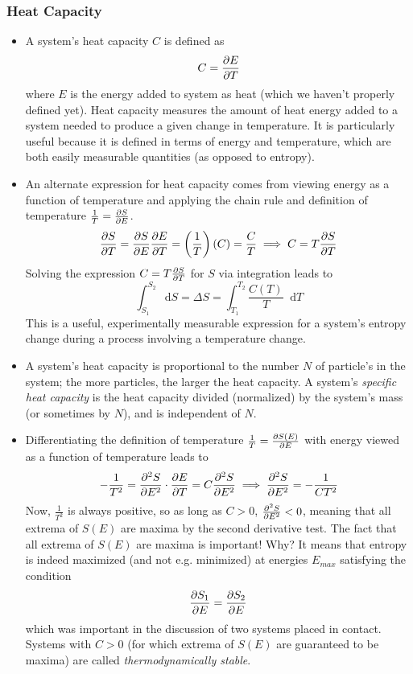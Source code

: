 \documentclass[11pt, a4paper]{article}
\newcommand{\diff}{\mathop{}\!\mathrm{d}} %
\begin{document}
\subsubsection{Heat Capacity}
\begin{itemize}
	\item A system's heat capacity $ C $ is defined as
	\begin{equation*}
		C = \pdv{E}{T}
	\end{equation*}
	where $ E $ is the energy added to system as heat (which we haven't properly defined yet). Heat capacity measures the amount of heat energy added to a system needed to produce a given change in temperature. It is particularly useful because it is defined in terms of energy and temperature, which are both easily measurable quantities (as opposed to entropy).
	
	\item An alternate expression for heat capacity comes from viewing energy as a function of temperature and applying the chain rule and definition of temperature $ \frac{1}{T} = \pdv{S}{E} $.
	\begin{equation*}
		\pdv{S}{T} = \pdv{S}{E} \pdv{E}{T} = \left (\frac{1}{T}\right )(C) = \frac{C}{T} \implies C = T \pdv{S}{T}
	\end{equation*}
	Solving the expression $ C = T \pdv{S}{T} $ for $ S $ via integration leads to
	\begin{equation*}
		\int_{S_{1}}^{S_{2}}\diff S = \Delta S = \int_{T_{1}}^{T_{2}}\frac{C(T)}{T}\diff T
	\end{equation*}
	This is a useful, experimentally measurable expression for a system's entropy change during a process involving a temperature change.
	
	\item A system's heat capacity is proportional to the number $ N $ of particle's in the system; the more particles, the larger the heat capacity. A system's \textit{specific heat capacity} is the heat capacity divided (normalized) by the system's mass (or sometimes by $ N $), and is independent of $ N $. 
	
	\item Differentiating the definition of temperature $ \frac{1}{T} = \pdv{S(E)}{E} $ with energy viewed as a function of temperature leads to 
	\begin{equation*}
		-\frac{1}{T^{2}} = \pdv[2]{S}{E} \cdot \pdv{E}{T} = C \pdv[2]{S}{E}  \implies  \pdv[2]{S}{E}  = -\frac{1}{CT^{2}}
	\end{equation*}
	Now, $ \frac{1}{T^{2}} $ is always positive, so as long as $ C > 0 $, $ \pdv[2]{S}{E} < 0 $, meaning that all extrema of $ S(E) $ are maxima by the second derivative test. The fact that all extrema of $ S(E) $ are maxima is important! Why? It means that entropy is indeed maximized (and not e.g. minimized) at energies $ E_{max} $ satisfying the condition
	\begin{equation*}
		\pdv{S_{1}}{E} (E_{max}) = \pdv{S_{2}}{E} (E_{tot} - E_{max})
	\end{equation*}
	which was important in the discussion of two systems placed in contact. Systems with $ C > 0 $ (for which extrema of $ S(E) $ are guaranteed to be maxima) are called \textit{thermodynamically stable}.
	

\end{itemize}
\end{document}
